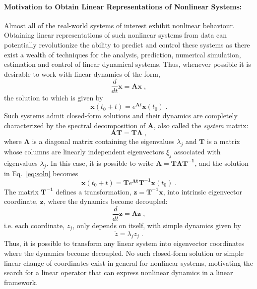 \paragraph{Motivation to Obtain Linear Representations of Nonlinear Systems:}
Almost all of the real-world systems of interest exhibit nonlinear behaviour. Obtaining linear representations of such nonlinear systems from data can potentially revolutionize the ability to predict and control these systems as there exist a wealth of techniques for the analysis, prediction, numerical simulation, estimation and control of linear dynamical systems. Thus, whenever possible it is desirable to work with linear dynamics of the form,
% 
\begin{equation}
    \label{eq:Lin}
    \frac{d}{dt}\mathbf{x} = \mathbf{A}\mathbf{x} \;,
\end{equation}
% 
the solution to which is given by 
% 
\begin{equation}
\label{eq:soln}
    \mathbf{x}(t_0+t) = e^{\mathbf{A}t}\mathbf{x}(t_0) \;.
\end{equation}
% 
Such systems admit closed-form solutions and their dynamics are completely characterized by the spectral decomposition of $\mathbf{A}$, also called the \textit{system} matrix:
% 
\begin{equation}
    \mathbf{AT} = \mathbf{T\Lambda}\;,
\end{equation}
% 
where $\mathbf{\Lambda}$ is a diagonal matrix containing the eigenvalues $\lambda_j$ and $\mathbf{T}$ is a matrix whose columns are linearly independent eigenvectors $\xi_j$ associated with eigenvalues $\lambda_j$. In this case, it is possible to write $\mathbf{A} = \mathbf{T\Lambda T^{-1}}$, and the solution in Eq.~\ref{eq:soln} becomes
% 
\begin{equation}
    \mathbf{x}(t_0+t) = \mathbf{T}e^{\mathbf{\Lambda t}}\mathbf{T^{-1}}\mathbf{x}(t_0)\;.
\end{equation}
% 
The matrix $\mathbf{T^{-1}}$ defines a transformation, $\mathbf{z = T^{-1}x}$, into intrinsic eigenvector coordinate, $\mathbf{z}$, where the dynamics become decoupled:
% 
\begin{equation}
    \frac{d}{dt}\mathbf{z} = \mathbf{\Lambda z} \;,
\end{equation}
% 
i.\;e. each coordinate, $z_j$, only depends on itself, with simple dynamics given by
% 
\begin{equation}
    \Dot{z} = \lambda_jz_j \;.
\end{equation}
% 
Thus, it is possible to transform any linear system into eigenvector coordinates where the dynamics become decoupled. No such closed-form solution or simple linear change of coordinates exist in general for nonlinear systems, motivating the search for a linear operator that can express nonlinear dynamics in a linear framework.
